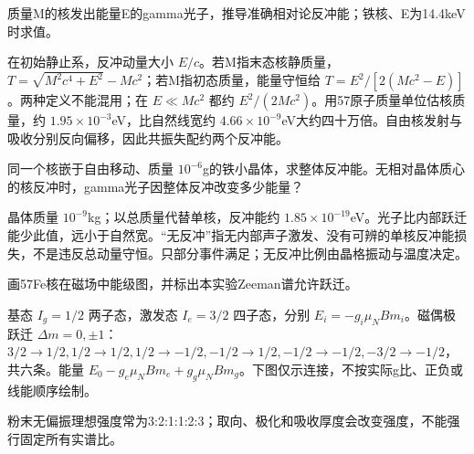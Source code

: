 \begin{exercise}\label{task:exp13-1}
质量M的核发出能量E的gamma光子，推导准确相对论反冲能；铁核、E为14.4keV时求值。
\end{exercise}
\begin{solution}
在初始静止系，反冲动量大小 $E/c$。若M指末态核静质量，$T=\sqrt{M^2c^4+E^2}-Mc^2$；若M指初态质量，能量守恒给 $T=E^2/[2(Mc^2-E)]$。两种定义不能混用；在 $E\ll Mc^2$ 都约 $E^2/(2Mc^2)$。用57原子质量单位估核质量，约 $1.95\times10^{-3}$eV，比自然线宽约 $4.66\times10^{-9}$eV大约四十万倍。自由核发射与吸收分别反向偏移，因此共振失配约两个反冲能。
\end{solution}
\begin{exercise}\label{task:exp13-2}
同一个核嵌于自由移动、质量 $10^{-6}$g的铁小晶体，求整体反冲能。无相对晶体质心的核反冲时，gamma光子因整体反冲改变多少能量？
\end{exercise}
\begin{solution}
晶体质量 $10^{-9}$kg；以总质量代替单核，反冲能约 $1.85\times10^{-19}$eV。光子比内部跃迁能少此值，远小于自然宽。“无反冲”指无内部声子激发、没有可辨的单核反冲能损失，不是违反总动量守恒。只部分事件满足；无反冲比例由晶格振动与温度决定。
\end{solution}
\begin{exercise}\label{task:exp13-3}
画57Fe核在磁场中能级图，并标出本实验Zeeman谱允许跃迁。
\end{exercise}
\begin{solution}
基态 $I_g=1/2$ 两子态，激发态 $I_e=3/2$ 四子态，分别 $E_i=-g_i\mu_NBm_i$。磁偶极跃迁 $\Delta m=0,\pm1$：$3/2\to1/2,1/2\to1/2,1/2\to-1/2,-1/2\to1/2,-1/2\to-1/2,-3/2\to-1/2$，共六条。能量 $E_0-g_e\mu_NBm_e+g_g\mu_NBm_g$。下图仅示连接，不按实际g比、正负或线能顺序绘制。
\begin{center}\end{center}
粉末无偏振理想强度常为3:2:1:1:2:3；取向、极化和吸收厚度会改变强度，不能强行固定所有实谱比。
\end{solution}
